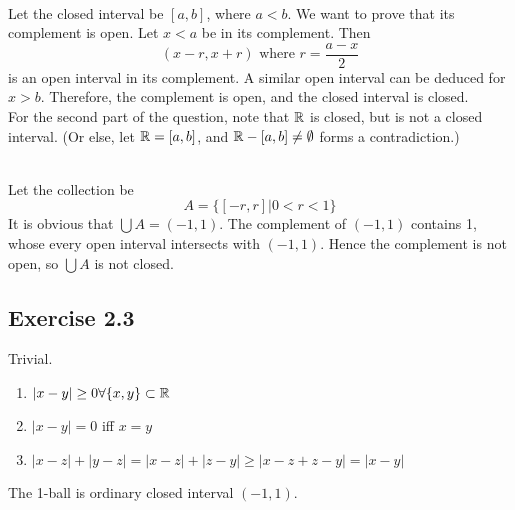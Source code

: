 
\begin{solution}
 \\Let the closed interval be $[a,b]$, where $a < b$. We want to prove that its complement is open. Let $x < a$ be in its complement. Then
 $$(x-r,x+r) \text{ where } r = \frac{a-x}{2}$$
 is an open interval in its complement. A similar open interval can be deduced for $x > b$. Therefore, the complement is open, and the closed interval is closed. \\
 For the second part of the question, note that $\mathbb{R}$ is closed, but is not a closed interval. (Or else, let $\mathbb{R} = [a,b]$, and $\mathbb{R}-[a,b] \neq \emptyset$ forms a contradiction.)
\end{solution}


\begin{solution}
 \\Let the collection be
 $$A = \{[-r,r]|0<r<1\}$$
 It is obvious that $\bigcup A = (-1,1)$. The complement of $(-1,1)$ contains 1, whose every open interval intersects with $(-1,1)$. Hence the complement is not open, so $\bigcup A$ is not closed.
\end{solution}

\subsection{Exercise 2.3}


\begin{solution}
Trivial.
\begin{enumerate}
 \item $|x-y| \geq 0 \forall \{x,y\} \subset \mathbb{R}$ \\
 \item $|x-y| = 0$ iff $x=y$ \\
 \item $|x-z|+|y-z|=|x-z|+|z-y| \geq |x-z+z-y| = |x-y|$ \\
 \end{enumerate}
 
 The 1-ball is ordinary closed interval $(-1,1)$.
\end{solution}

